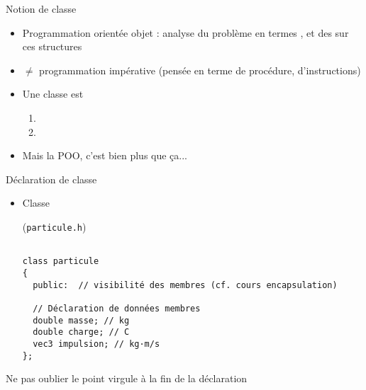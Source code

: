 \documentclass[c]{beamer}
\begin{document}
\begin{frame}[fragile]{Notion de classe}
 \begin{itemize}[<+->]
\item Programmation orientée objet : analyse du problème en termes , et des  sur ces structures

\item \(\neq\) programmation impérative (pensée en terme de procédure, d'instructions)

\item Une classe est

\begin{enumerate}
\item {}

\item {}
\end{enumerate}

\item Mais la POO, c'est bien plus que ça...
\end{itemize}
\end{frame}


\begin{frame}[fragile]{Déclaration de classe}
 \begin{itemize}
\item Classe 
\begin{cbox}[][lwuc](\texttt{particule.h})
\begin{verbatim}

class particule
{
  public:  // visibilité des membres (cf. cours encapsulation)

  // Déclaration de données membres
  double masse; // kg
  double charge; // C
  vec3 impulsion; // kg·m/s
};
\end{verbatim}
\end{cbox}
\end{itemize}

\pause

\begin{cbox}[][][\centering]
 Ne pas oublier le point virgule à la fin de la déclaration
\end{cbox}
\end{frame}
\end{document}
